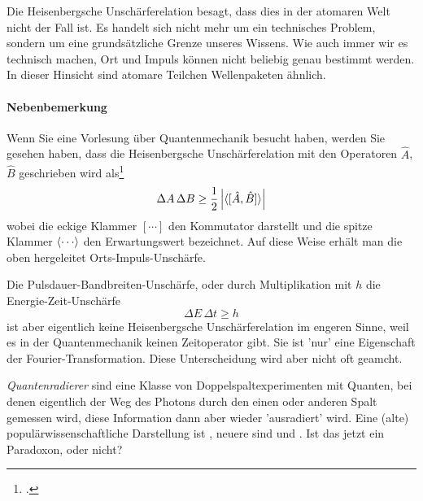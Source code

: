 Die Heisenbergsche Unschärferelation besagt, dass dies in der atomaren Welt nicht der Fall ist. Es handelt sich nicht mehr um ein technisches Problem, sondern um eine grundsätzliche Grenze unseres Wissens. Wie auch immer wir es technisch machen, Ort und Impuls können nicht beliebig genau bestimmt werden. In dieser Hinsicht sind atomare Teilchen Wellenpaketen ähnlich.

\paragraph*{Nebenbemerkung} Wenn Sie eine Vorlesung über Quantenmechanik besucht haben, werden Sie gesehen haben, dass die Heisenbergsche Unschärferelation mit den Operatoren $\hat{A}$, $\hat{B}$ geschrieben wird als\footcite{Nolting-QM} 
\begin{equation}
    \Delta A \, \Delta B \ge \frac{1}{2} \left|   \braket{ [\hat{A}, \hat{B}]  } \right|
\end{equation}
wobei die eckige Klammer $[ \cdots]$ den Kommutator darstellt und die spitze Klammer $\braket{\cdots}$ den Erwartungswert bezeichnet. Auf diese Weise erhält man die oben hergeleitet Orts-Impuls-Unschärfe.

Die Pulsdauer-Bandbreiten-Unschärfe, oder durch Multiplikation mit $h$ die Energie-Zeit-Unschärfe
\begin{equation}
    \Delta E \, \Delta t \ge h
\end{equation}
ist aber eigentlich keine Heisenbergsche Unschärferelation im engeren Sinne, weil es in der Quantenmechanik keinen Zeitoperator gibt. Sie ist 'nur' eine Eigenschaft der Fourier-Transformation. Diese Unterscheidung wird aber nicht oft geamcht.


\begin{questions}
    \item \emph{Quantenradierer} sind eine Klasse von Doppelspaltexperimenten mit Quanten, bei denen eigentlich der Weg des Photons durch den einen oder anderen Spalt gemessen wird, diese Information dann aber wieder 'ausradiert' wird. Eine (alte) populärwissenschaftliche Darstellung ist \cite{WT_dualismus}, neuere sind \cite{heise_quantenradierer} und \cite{Hossenfelder_quantenradierer}. Ist das jetzt ein Paradoxon, oder nicht?
\end{questions}






